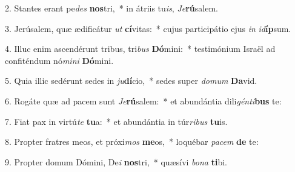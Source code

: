 2. Stantes erant pe\textit{des} \textbf{nos}tri,~*  in átriis tu\textit{is}, \textit{Je}\textbf{rú}salem.\

3. Jerúsalem, quæ ædificátur \textit{ut} \textbf{cí}vitas:~*  cujus participátio ejus \textit{in} \textit{id}\textbf{íp}sum.\

4. Illuc enim ascendérunt tribus, tri\textit{bus} \textbf{Dó}mini:~*  testimónium Israël ad confiténdum nó\textit{mi}\textit{ni} \textbf{Dó}mini.\

5. Quia illic sedérunt sedes in \textit{ju}\textbf{dí}cio,~*  sedes super \textit{do}\textit{mum} \textbf{Da}vid.\

6. Rogáte quæ ad pacem sunt \textit{Je}\textbf{rú}salem:~*  et abundántia dili\textit{gén}\textit{ti}\textbf{bus} te:\

7. Fiat pax in virtú\textit{te} \textbf{tu}a:~*  et abundántia in túr\textit{ri}\textit{bus} \textbf{tu}is.\

8. Propter fratres meos, et próxi\textit{mos} \textbf{me}os,~*  loquébar \textit{pa}\textit{cem} \textbf{de} te:\

9. Propter domum Dómini, De\textit{i} \textbf{nos}tri,~*  quæsívi \textit{bo}\textit{na} \textbf{ti}bi.\

